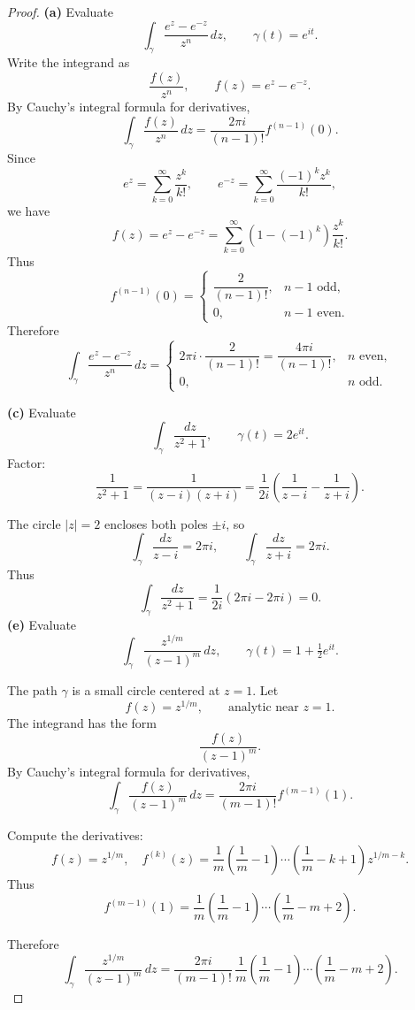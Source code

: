 \documentclass[12pt, a4paper]{report}
\theoremstyle{spaced}
\begin{document}
\begin{proof}
	\textbf{(a)}  Evaluate
	\[
		\int_{\gamma} \frac{e^{z}-e^{-z}}{z^{n}}\,dz,
		\qquad \gamma(t)=e^{it}.
	\]
	Write the integrand as
	\[
		\frac{f(z)}{z^{n}}, \qquad f(z)= e^{z}-e^{-z}.
	\]
	By Cauchy's integral formula for derivatives,
	\[
		\int_{\gamma} \frac{f(z)}{z^{n}}\,dz
		= \frac{2\pi i}{(n-1)!} f^{(n-1)}(0).
	\]
	Since
	\[
		e^{z} = \sum_{k=0}^{\infty} \frac{z^{k}}{k!}, \qquad
		e^{-z} = \sum_{k=0}^{\infty} \frac{(-1)^{k} z^{k}}{k!},
	\]
	we have
	\[
		f(z) = e^{z}-e^{-z}
		= \sum_{k=0}^{\infty} \left(1-(-1)^{k}\right)\frac{z^{k}}{k!}.
	\]
	Thus
	\[
		f^{(n-1)}(0) =
		\begin{cases}
			\dfrac{2}{(n-1)!}, & n-1 \text{ odd},  \\[6pt]
			0,                 & n-1 \text{ even}.
		\end{cases}
	\]
	Therefore
	\[
		\displaystyle
		\int_{\gamma} \frac{e^{z}-e^{-z}}{z^{n}}\,dz
		=
		\begin{cases}
			\displaystyle 2\pi i \cdot \dfrac{2}{(n-1)!} = \dfrac{4\pi i}{(n-1)!}, & n \text{ even}, \\[10pt]
			0,                                                                     & n \text{ odd}.
		\end{cases}
	\]

	\bigskip
	\textbf{(c)} Evaluate
	\[
		\int_{\gamma} \frac{dz}{z^{2}+1},
		\qquad \gamma(t)=2e^{it}.
	\]
	Factor:
	\[
		\frac{1}{z^{2}+1}
		= \frac{1}{(z-i)(z+i)}
		= \frac{1}{2i}\left( \frac{1}{z-i} - \frac{1}{z+i} \right).
	\]

	The circle $|z|=2$ encloses both poles $\pm i$, so
	\[
		\int_{\gamma} \frac{dz}{z-i} = 2\pi i,
		\qquad
		\int_{\gamma} \frac{dz}{z+i} = 2\pi i.
	\]
	Thus
	\[
		\int_{\gamma} \frac{dz}{z^{2}+1}
		= \frac{1}{2i}\left(2\pi i - 2\pi i\right) = 0.
	\]
	\bigskip
	\textbf{(e)} Evaluate
	\[
		\int_{\gamma} \frac{z^{1/m}}{(z-1)^{m}}\,dz,
		\qquad \gamma(t)=1+\tfrac12 e^{it}.
	\]

	The path $\gamma$ is a small circle centered at $z=1$.  Let
	\[
		f(z)= z^{1/m},
		\qquad \text{analytic near } z=1.
	\]
	The integrand has the form
	\[
		\frac{f(z)}{(z-1)^{m}}.
	\]
	By Cauchy’s integral formula for derivatives,
	\[
		\int_{\gamma} \frac{f(z)}{(z-1)^{m}}\,dz
		= \frac{2\pi i}{(m-1)!} f^{(m-1)}(1).
	\]

	Compute the derivatives:
	\[
		f(z)= z^{1/m},\quad
		f^{(k)}(z)
		= \frac{1}{m}\left(\frac{1}{m}-1\right)\cdots\left(\frac{1}{m}-k+1\right) z^{1/m-k}.
	\]
	Thus
	\[
		f^{(m-1)}(1)
		= \frac{1}{m}\left(\frac{1}{m}-1\right)\cdots\left(\frac{1}{m}-m+2\right).
	\]

	Therefore
	\[
		\displaystyle
		\int_{\gamma} \frac{z^{1/m}}{(z-1)^{m}}\,dz
		=
		\frac{2\pi i}{(m-1)!}
		\,\frac{1}{m}\left(\frac{1}{m}-1\right)\cdots\left(\frac{1}{m}-m+2\right).
	\]

\end{proof}
\end{document}
